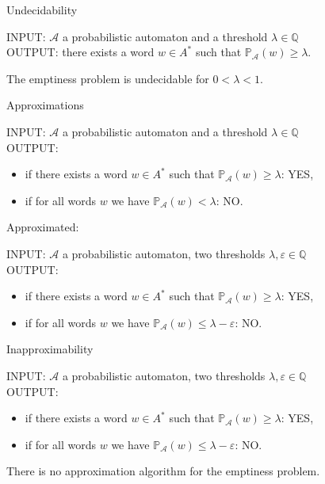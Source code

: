 \documentclass[svgnames]{beamer}
\renewcommand{\AA}{\mathcal{A}}
\newcommand{\QQ}{\mathbb{Q}}
\newcommand{\prob}[1]{\mathbb{P}_{#1}}
\begin{document}
\begin{frame}{Undecidability}

\begin{framed}
INPUT: $\AA$ a probabilistic automaton and a threshold $\lambda \in \QQ$\\
OUTPUT: there exists a word $w \in A^*$ such that $\prob{\AA}(w) \ge \lambda$.
\end{framed}

\begin{theorem}[Paz, 1971]
The emptiness problem is undecidable for $0 < \lambda < 1$.
\end{theorem}
\end{frame}

\begin{frame}{Approximations}
\begin{framed}
INPUT: $\AA$ a probabilistic automaton and a threshold $\lambda \in \QQ$\\
OUTPUT: 
\begin{itemize}
	\item if there exists a word $w \in A^*$ such that $\prob{\AA}(w) \ge \lambda$: YES,
	\item if for all words $w$ we have $\prob{\AA}(w) < \lambda$: NO.
\end{itemize}
\end{framed}

Approximated:
\begin{framed}
INPUT: $\AA$ a probabilistic automaton, two thresholds $\lambda,\varepsilon \in \QQ$\\
OUTPUT: 
\begin{itemize}
	\item if there exists a word $w \in A^*$ such that $\prob{\AA}(w) \ge \lambda$: YES,
	\item if for all words $w$ we have $\prob{\AA}(w) \le \lambda - \varepsilon$: NO.
\end{itemize}
\end{framed}
\end{frame}

\begin{frame}{Inapproximability}
\begin{framed}
INPUT: $\AA$ a probabilistic automaton, two thresholds $\lambda,\varepsilon \in \QQ$\\
OUTPUT: 
\begin{itemize}
	\item if there exists a word $w \in A^*$ such that $\prob{\AA}(w) \ge \lambda$: YES,
	\item if for all words $w$ we have $\prob{\AA}(w) \le \lambda - \varepsilon$: NO.
\end{itemize}
\end{framed}

\pause

\begin{theorem}
There is no approximation algorithm for the emptiness problem.
\end{theorem}
\end{frame}
\end{document}
